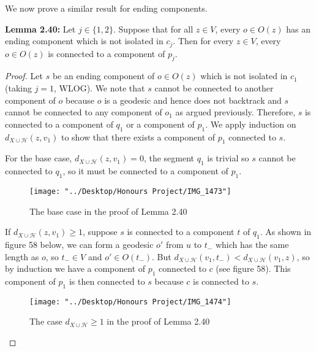 \documentclass[12pt]{article}
\newcommand{\vs}{\vskip10pt}
\begin{document}
	We now prove a similar result for ending components. 
	
	\vs 
	
	\textbf{Lemma 2.40: } Let $j \in \{1,2\}$. Suppose that for all $z \in V$, every $o \in O(z)$ has an ending component which is not isolated in $c_j$. Then for every $z \in V$, every $o \in O(z)$ is connected to a component of $p_j$. 
	
	\begin{proof}
		
		Let $s$ be an ending component of $o \in O(z)$ which is not isolated in $c_1$ (taking $j = 1$, WLOG). We note that $s$ cannot be connected to another component of $o$ because $o$ is a geodesic and hence does not backtrack and $s$ cannot be connected to any component of $o_1$ as argued previously. Therefore, $s$ is connected to a component of $q_1$ or a component of $p_1$. We apply induction on $d_{X \cup \mathcal{H}} (z, v_1)$ to show that there exists a component of $p_1$ connected to $s$.
		
		\vs 
		
		For the base case, $d_{X \cup \mathcal{H}}(z, v_1) = 0$, the segment $q_1$ is trivial so $s$ cannot be connected to $q_1$, so it must be connected to a component of $p_1$. 
		
\begin{figure} [H]
	\centering
	\texttt{[image: "../Desktop/Honours Project/IMG\_1473"]}
	\caption{The base case in the proof of Lemma 2.40}
	\label{fig:img1473}
\end{figure}
		
		\vs 
		
		If $d_{X \cup \mathcal{H}}(z, v_1) \geq 1$, suppose $s$ is connected to a component $t$ of $q_1$. As shown in  figure 58 below, we can form a geodesic $o'$ from $u$ to $t_-$ which has the same length as $o$, so $t_- \in V$ and $o' \in O(t_-)$. But $d_{X \cup \mathcal{H}}(v_1, t_-) < d_{X \cup \mathcal{H}}(v_1, z)$, so by induction we have a component of $p_1$ connected to $c$ (see figure 58). This component of $p_1$ is then connected to $s$ because $c$ is connected to $s$.
		
\begin{figure} [H]
	\centering
	\texttt{[image: "../Desktop/Honours Project/IMG\_1474"]}
	\caption{The case $d_{X \cup \mathcal{H}} \geq 1$ in the proof of Lemma 2.40}
	\label{fig:img1474}
\end{figure}
		
	\end{proof}
\end{document}

